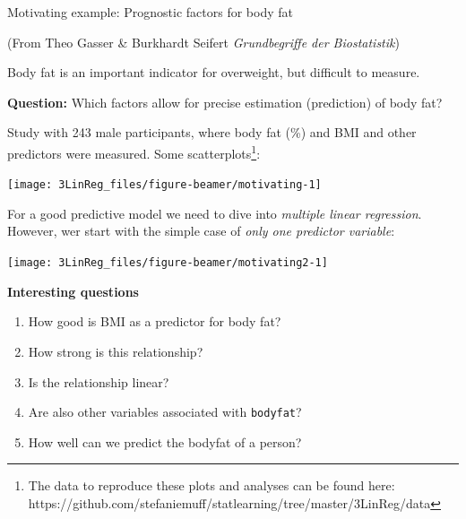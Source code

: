 \documentclass[10pt,ignorenonframetext,]{beamer}
\providecommand{\tightlist}{%
  \setlength{\itemsep}{0pt}\setlength{\parskip}{0pt}}
\begin{document}
\begin{frame}

\begin{block}{Motivating example: Prognostic factors for body fat}

\tiny(From Theo Gasser \& Burkhardt Seifert \emph{Grundbegriffe der
Biostatistik})

\vspace{2mm} \normalsize
Body fat is an important indicator for overweight, but difficult to
measure.

\vspace{2mm} \textbf{Question:} Which factors allow for precise
estimation (prediction) of body fat?

\vspace{2mm} Study with 243 male participants, where body fat (\%) and
BMI and other predictors were measured. Some
scatterplots\footnote{The data to reproduce these plots and analyses can be found here: https://github.com/stefaniemuff/statlearning/tree/master/3LinReg/data}:

\begin{center}\texttt{[image: 3LinReg\_files/figure-beamer/motivating-1]} \end{center}

\end{block}

\end{frame}

\begin{frame}

For a good predictive model we need to dive into \emph{multiple linear
regression}. However, wer start with the simple case of \emph{only one
predictor variable}:

\begin{center}\texttt{[image: 3LinReg\_files/figure-beamer/motivating2-1]} \end{center}

\end{frame}

\begin{frame}[fragile]

\textbf{Interesting questions}

\begin{enumerate}
\def\labelenumi{\arabic{enumi}.}
\tightlist
\item
  How good is BMI as a predictor for body fat?
\item
  How strong is this relationship?
\item
  Is the relationship linear?
\item
  Are also other variables associated with \texttt{bodyfat}?
\item
  How well can we predict the bodyfat of a person?
\end{enumerate}

\end{frame}
\end{document}
